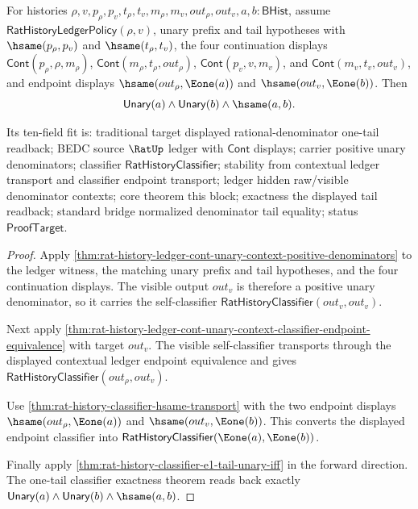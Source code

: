 \begin{theorem}
\label{thm:rat-history-ledger-cont-unary-context-e1-pair-readback}
For histories
$\rho,v,p_\rho,p_v,t_\rho,t_v,m_\rho,m_v,out_\rho,out_v,a,b:\mathsf{BHist}$,
assume $\mathsf{RatHistoryLedgerPolicy}(\rho,v)$, unary prefix and tail
hypotheses with $\hsame(p_\rho,p_v)$ and $\hsame(t_\rho,t_v)$, the four
continuation displays
$\mathsf{Cont}(p_\rho,\rho,m_\rho)$,
$\mathsf{Cont}(m_\rho,t_\rho,out_\rho)$,
$\mathsf{Cont}(p_v,v,m_v)$, and
$\mathsf{Cont}(m_v,t_v,out_v)$, and endpoint displays
$\hsame(out_\rho,\Eone(a))$ and $\hsame(out_v,\Eone(b))$. Then
$$
\mathsf{Unary}(a)\land\mathsf{Unary}(b)\land\hsame(a,b).
$$

Its ten-field fit is: traditional target displayed rational-denominator
one-tail readback; BEDC source $\RatUp$ ledger with $\mathsf{Cont}$ displays;
carrier positive unary denominators; classifier
$\mathsf{RatHistoryClassifier}$; stability from contextual ledger transport
and classifier endpoint transport; ledger hidden raw/visible denominator
contexts; core theorem this block; exactness the displayed tail readback;
standard bridge normalized denominator tail equality; status
$\mathsf{ProofTarget}$.
\end{theorem}
\begin{proof}
Apply
\autoref{thm:rat-history-ledger-cont-unary-context-positive-denominators} to
the ledger witness, the matching unary prefix and tail hypotheses, and the
four continuation displays. The visible output $out_v$ is therefore a positive
unary denominator, so it carries the self-classifier
$\mathsf{RatHistoryClassifier}(out_v,out_v)$.

Next apply
\autoref{thm:rat-history-ledger-cont-unary-context-classifier-endpoint-equivalence}
with target $out_v$. The visible self-classifier transports through the
displayed contextual ledger endpoint equivalence and gives
$\mathsf{RatHistoryClassifier}(out_\rho,out_v)$.

Use
\autoref{thm:rat-history-classifier-hsame-transport} with the two endpoint
displays $\hsame(out_\rho,\Eone(a))$ and $\hsame(out_v,\Eone(b))$. This
converts the displayed endpoint classifier into
$\mathsf{RatHistoryClassifier}(\Eone(a),\Eone(b))$.

Finally apply
\autoref{thm:rat-history-classifier-e1-tail-unary-iff} in the forward
direction. The one-tail classifier exactness theorem reads back exactly
$\mathsf{Unary}(a)\land\mathsf{Unary}(b)\land\hsame(a,b)$.
\end{proof}

